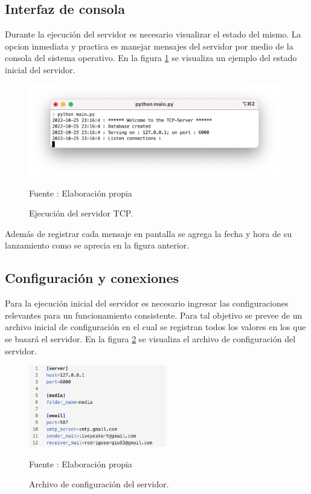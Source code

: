 \subsection{Interfaz de consola}
Durante la ejecución del servidor es necesario visualizar el estado del mismo. La opcion inmediata y practica es manejar mensajes del servidor por medio de la consola del sistema operativo. En la figura \ref{fig:servertcp_console} se visualiza un ejemplo del estado inicial del servidor.
\begin{figure}[H]
    \begin{center}
        \includegraphics[width=11cm]{img/capitulo_5/tcp_server.png}
        \caption{Ejecución del servidor TCP.}
        Fuente : Elaboración propia
        \label{fig:servertcp_console}
    \end{center}
\end{figure}
Además de registrar cada mensaje en pantalla se agrega la fecha y hora de su lanzamiento como se aprecia en la figura anterior.
\subsection{Configuración y conexiones}
Para la ejecución inicial del servidor es necesario ingresar las configuraciones relevantes para un funcionamiento consistente. Para tal objetivo se prevee de un archivo inicial de configuración en el cual se registran todos los valores en los que se basará el servidor. En la figura \ref{fig:config_file} se visualiza el archivo de configuración del servidor.\\

\begin{figure}[H]
    \begin{center}
        \includegraphics[width=6cm]{img/capitulo_5/config.ini.png}
    \end{center}
    \begin{center}
        \caption{Archivo de configuración del servidor.}
        Fuente : Elaboración propia
        \label{fig:config_file}
    \end{center}
\end{figure}

